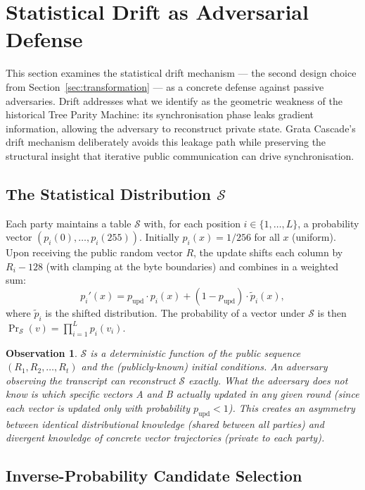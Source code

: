 \documentclass[11pt,a4paper]{article}
\newtheorem{observation}{Observation}
\begin{document}
\section{Statistical Drift as Adversarial Defense}\label{sec:drift}

This section examines the statistical drift mechanism --- the second design choice from Section~\ref{sec:transformation} --- as a concrete defense against passive adversaries. Drift addresses what we identify as the geometric weakness of the historical Tree Parity Machine: its synchronisation phase leaks gradient information, allowing the adversary to reconstruct private state. Grata Cascade's drift mechanism deliberately avoids this leakage path while preserving the structural insight that iterative public communication can drive synchronisation.

\subsection{The Statistical Distribution $\mathcal{S}$}\label{sec:stat}

Each party maintains a table $\mathcal{S}$ with, for each position $i \in \{1, \ldots, L\}$, a probability vector $(p_i(0), \ldots, p_i(255))$. Initially $p_i(x) = 1/256$ for all $x$ (uniform). Upon receiving the public random vector $R$, the update shifts each column by $R_i - 128$ (with clamping at the byte boundaries) and combines in a weighted sum:
\[
p_i'(x) = p_\text{upd} \cdot p_i(x) + (1 - p_\text{upd}) \cdot \tilde{p}_i(x),
\]
where $\tilde{p}_i$ is the shifted distribution. The probability of a vector under $\mathcal{S}$ is then $\Pr_\mathcal{S}(v) = \prod_{i=1}^{L} p_i(v_i)$.

\begin{observation}\label{obs:public-stat}
$\mathcal{S}$ is a deterministic function of the public sequence $(R_1, R_2, \ldots, R_t)$ and the (publicly-known) initial conditions. An adversary observing the transcript can reconstruct $\mathcal{S}$ exactly. What the adversary does \emph{not} know is \emph{which specific vectors} A and B actually updated in any given round (since each vector is updated only with probability $p_\text{upd} < 1$). This creates an asymmetry between identical distributional knowledge (shared between all parties) and divergent knowledge of concrete vector trajectories (private to each party).
\end{observation}

\subsection{Inverse-Probability Candidate Selection}\label{sec:selection}
\end{document}
